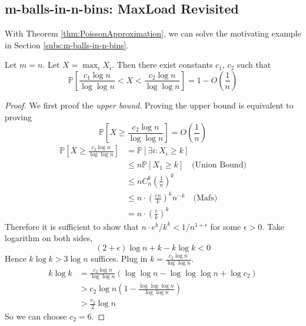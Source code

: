     \subsection{m-balls-in-n-bins: MaxLoad Revisited}
        With Theorem \ref{thm:PoissonApproximation}, we can solve the motivating example in Section \ref{subs:m-balls-in-n-bins}.
        \begin{theorem}
            Let $m=n$. Let $X = \max_i X_i$. Then there exist constants $c_1$, $c_2$ such that
            \[ \mathbb{P}\left[\frac{c_1\log n}{\log\log n} < X < \frac{c_2\log n}{\log\log n}\right] = 1 - O\left(\frac{1}{n}\right) \]
        \end{theorem}
        \begin{proof}
            We first proof the \emph{upper bound}. Proving the upper bound is equivalent to proving
            \[\mathbb{P}\left[ X \ge \frac{c_2\log n}{\log\log n} \right] = O\left(\frac{1}{n}\right) \]
            \begin{align*}
                \mathbb{P}\left[ X \ge \frac{c_2\log n}{\log\log n} \right] &= \mathbb{P}[\exists i: X_i \ge k]\\
                &\le n\mathbb{P}[X_1 \ge k] \quad \text{(Union Bound)}\\
                &\le n C^k_n\left(\frac{1}{n}\right)^k\\
                &\le n\cdot \left(\frac{en}{k}\right)^k n^{-k} \quad \text{(Mafs)}\\
                &= n\cdot\left(\frac{e}{k}\right)^k
            \end{align*}
            Therefore it is sufficient to show that $n\cdot e^k / k^k < 1/n^{1+\epsilon}$ for some $\epsilon > 0$. Take logarithm on both sides,
            \[ (2+\epsilon)\log n + k - k\log k < 0 \]
            Hence $k\log k > 3\log n$ suffices. Plug in $k = \frac{c_2\log n}{\log\log n}$.
            \begin{align*}
                k\log k &= \frac{c_2\log n}{\log\log n} (\log\log n - \log\log\log n + \log c_2)\\
                &> c_2\log n\left(1- \frac{\log\log\log n}{\log\log n}\right)\\
                &> \frac{c_2}{2}\log n
            \end{align*}
            So we can choose $c_2 = 6$.
            

\end{proof}
